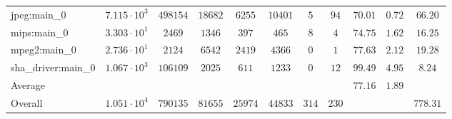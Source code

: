 \begin{tabular}{|l|c|c|c|c|c|c|c|c|c|c|}
jpeg:main\_0            & $ 7.115 \cdot 10^{3} $ & $ 498154 $ & $ 18682 $ & $ 6255  $ & $ 10401 $ & $ 5   $ & $ 94  $ & $ 70.01       $ & $ 0.72    $ & $ 66.20   $ \\
mips:main\_0            & $ 3.303 \cdot 10^{1} $ & $ 2469   $ & $ 1346  $ & $ 397   $ & $ 465   $ & $ 8   $ & $ 4   $ & $ 74.75       $ & $ 1.62    $ & $ 16.25   $ \\
mpeg2:main\_0           & $ 2.736 \cdot 10^{1} $ & $ 2124   $ & $ 6542  $ & $ 2419  $ & $ 4366  $ & $ 0   $ & $ 1   $ & $ 77.63       $ & $ 2.12    $ & $ 19.28   $ \\
sha\_driver:main\_0     & $ 1.067 \cdot 10^{3} $ & $ 106109 $ & $ 2025  $ & $ 611   $ & $ 1233  $ & $ 0   $ & $ 12  $ & $ 99.49       $ & $ 4.95    $ & $ 8.24    $ \\
\hline
Average                 & $                    $ & $        $ & $       $ & $       $ & $       $ & $     $ & $     $ & $ 77.16       $ & $ 1.89    $ & $         $ \\
\hline
Overall                 & $ 1.051 \cdot 10^{4} $ & $ 790135 $ & $ 81655 $ & $ 25974 $ & $ 44833 $ & $ 314 $ & $ 230 $ & $             $ & $         $ & $ 778.31  $ \\
\hline
\end{tabular}

